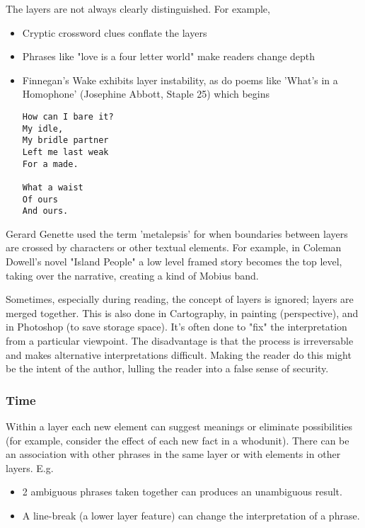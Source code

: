 \documentclass[11pt]{article}
\begin{document}
The layers are not always clearly distinguished. For example,
\begin{itemize}
\item Cryptic crossword clues conflate the layers
\item Phrases like "love is a four letter world" make readers change depth
\item Finnegan's Wake exhibits layer instability, as do poems like 'What's in a Homophone' (Josephine Abbott, Staple 25) which begins
\begin{verbatim}
How can I bare it?
My idle,
My bridle partner
Left me last weak
For a made.

What a waist
Of ours
And ours.
\end{verbatim}

\end{itemize}


Gerard Genette used the term  'metalepsis' for when boundaries between layers are crossed by characters or other textual
elements. For example, in Coleman Dowell's novel "Island People" a low level framed story becomes the top level, taking over the narrative, creating a kind of Mobius band. 




Sometimes, especially during reading, the concept of layers is ignored; 
layers are merged together. This is also done in Cartography, in painting 
(perspective), and in Photoshop (to save storage space). It's often done to
"fix" the interpretation from a particular viewpoint. The disadvantage
is that the process is irreversable and makes alternative interpretations
difficult. Making the reader do this might be the intent of the author, lulling the reader into a false
  sense of security.


\subsubsection*{Time}

Within a layer each new element
can suggest meanings or eliminate possibilities (for example, consider the
effect of each new fact in a whodunit). There can be an association with other 
phrases in the same layer or with elements in other layers. E.g.

\begin{itemize}
\item 2 ambiguous phrases taken together can produces an unambiguous result. 
\item A line-break (a lower layer feature) can change the interpretation of a phrase. 
\end{itemize}
\end{document}
